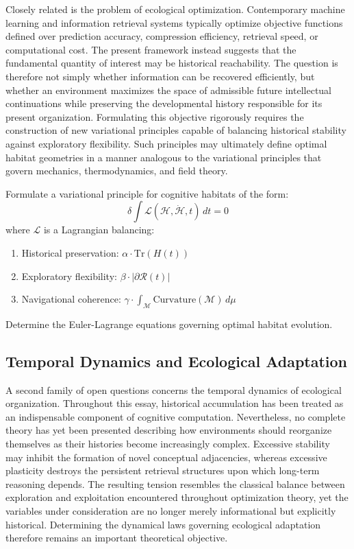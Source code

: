 \documentclass[12pt,oneside]{article}
\theoremstyle{remark}
\begin{document}
Closely related is the problem of ecological optimization. Contemporary machine learning and information retrieval systems typically optimize objective functions defined over prediction accuracy, compression efficiency, retrieval speed, or computational cost. The present framework instead suggests that the fundamental quantity of interest may be historical reachability. The question is therefore not simply whether information can be recovered efficiently, but whether an environment maximizes the space of admissible future intellectual continuations while preserving the developmental history responsible for its present organization. Formulating this objective rigorously requires the construction of new variational principles capable of balancing historical stability against exploratory flexibility. Such principles may ultimately define optimal habitat geometries in a manner analogous to the variational principles that govern mechanics, thermodynamics, and field theory.

\begin{problem}
Formulate a variational principle for cognitive habitats of the form:
\[
\delta \int \mathcal{L}(\mathcal{H}, \dot{\mathcal{H}}, t) \, dt = 0
\]
where \(\mathcal{L}\) is a Lagrangian balancing:
\begin{enumerate}
\item Historical preservation: \(\alpha \cdot \text{Tr}(H(t))\)
\item Exploratory flexibility: \(\beta \cdot |\partial \mathcal{R}(t)|\)
\item Navigational coherence: \(\gamma \cdot \int_{\mathcal{M}} \text{Curvature}(\mathcal{M}) \, d\mu\)
\end{enumerate}
Determine the Euler-Lagrange equations governing optimal habitat evolution.
\end{problem}

\subsection{Temporal Dynamics and Ecological Adaptation}

A second family of open questions concerns the temporal dynamics of ecological organization. Throughout this essay, historical accumulation has been treated as an indispensable component of cognitive computation. Nevertheless, no complete theory has yet been presented describing how environments should reorganize themselves as their histories become increasingly complex. Excessive stability may inhibit the formation of novel conceptual adjacencies, whereas excessive plasticity destroys the persistent retrieval structures upon which long-term reasoning depends. The resulting tension resembles the classical balance between exploration and exploitation encountered throughout optimization theory, yet the variables under consideration are no longer merely informational but explicitly historical. Determining the dynamical laws governing ecological adaptation therefore remains an important theoretical objective.
\end{document}
